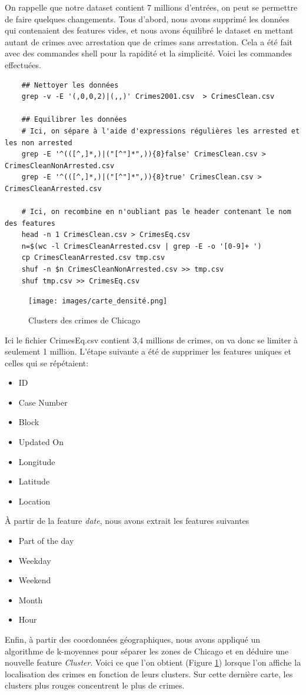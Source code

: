\documentclass{article}
\begin{document}
    On rappelle que notre dataset contient 7 millions d'entrées, on peut se permettre
    de faire quelques changements.
    Tous d'abord, nous avons supprimé les données qui contenaient des features vides,
    et nous avons équilibré le dataset en mettant autant de crimes avec arrestation que de crimes sans arrestation.
    Cela a été fait avec des commandes shell pour la rapidité et la simplicité. 
    Voici les commandes effectuées.

    \begin{Verbatim}
    ## Nettoyer les données
    grep -v -E '(,0,0,2)|(,,)' Crimes2001.csv  > CrimesClean.csv
    
    ## Equilibrer les données
    # Ici, on sépare à l'aide d'expressions régulières les arrested et les non arrested
    grep -E '^(([^,]*,)|("[^"]*",)){8}false' CrimesClean.csv > CrimesCleanNonArrested.csv
    grep -E '^(([^,]*,)|("[^"]*",)){8}true' CrimesClean.csv > CrimesCleanArrested.csv
 
    # Ici, on recombine en n'oubliant pas le header contenant le nom des features
    head -n 1 CrimesClean.csv > CrimesEq.csv
    n=$(wc -l CrimesCleanArrested.csv | grep -E -o '[0-9]+ ')
    cp CrimesCleanArrested.csv tmp.csv
    shuf -n $n CrimesCleanNonArrested.csv >> tmp.csv
    shuf tmp.csv >> CrimesEq.csv
    \end{Verbatim}

    \begin{figure}
	    \centering
	    \texttt{[image: images/carte\_densité.png]}
	    \caption{Clusters des crimes de Chicago}
	    \label{E}
    \end{figure}
    Ici le fichier CrimesEq.csv contient 3,4 millions de crimes, on va donc se limiter à
    seulement 1 million.
    L'étape suivante a été de supprimer les features uniques et celles qui se répétaient:
    \begin{itemize}
	    \item ID
	    \item Case Number
	    \item Block
	    \item Updated On
	    \item Longitude
	    \item Latitude
	    \item Location
    \end{itemize}
    À partir de la feature \textit{date}, nous avons extrait les features suivantes
    \begin{itemize}
	    \item Part of the day
	    \item Weekday
	    \item Weekend
	    \item Month
	    \item Hour
    \end{itemize}
    Enfin, à partir des coordonnées géographiques, nous avons appliqué un algorithme
    de k-moyennes pour séparer les zones de Chicago et en déduire une nouvelle
    feature \textit{Cluster}. 
    Voici ce que l'on obtient (Figure \ref{E}) lorsque l'on affiche la localisation des crimes en
    fonction de leurs clusters.
    Sur cette dernière carte, les clusters plus rouges concentrent le plus de crimes.
\end{document}
